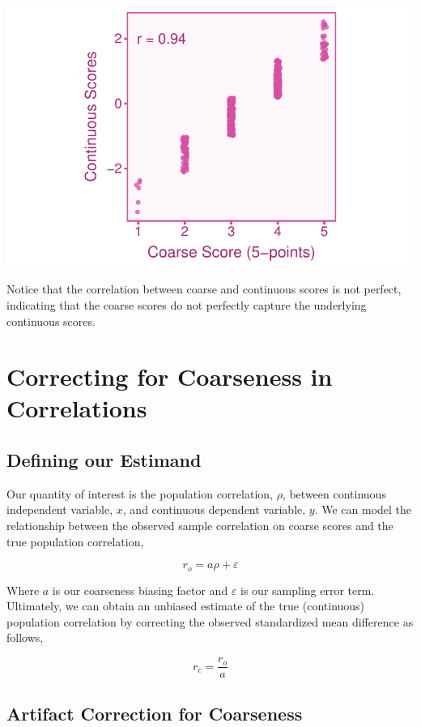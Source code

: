 \documentclass[
  letterpaper,
  DIV=11,
  numbers=noendperiod]{scrreprt}
\begin{document}
\includegraphics{scale_coarseness_files/figure-pdf/unnamed-chunk-1-1.pdf}

Notice that the correlation between coarse and continuous scores is not
perfect, indicating that the coarse scores do not perfectly capture the
underlying continuous scores.

\hypertarget{correcting-for-coarseness-in-correlations}{%
\section{Correcting for Coarseness in
Correlations}\label{correcting-for-coarseness-in-correlations}}

\hypertarget{defining-our-estimand-5}{%
\subsection{Defining our Estimand}\label{defining-our-estimand-5}}

Our quantity of interest is the population correlation, \(\rho\),
between continuous independent variable, \(x\), and continuous dependent
variable, \(y\). We can model the relationship between the observed
sample correlation on coarse scores and the true population correlation,

\[
r_o = a\rho+\varepsilon
\]

Where \(a\) is our coarseness biasing factor and \(\varepsilon\) is our
sampling error term. Ultimately, we can obtain an unbiased estimate of
the true (continuous) population correlation by correcting the observed
standardized mean difference as follows,

\[
r_c = \frac{r_o}{a}
\]

\hypertarget{sec-coarse-cor}{%
\subsection{Artifact Correction for Coarseness}\label{sec-coarse-cor}}
\end{document}
